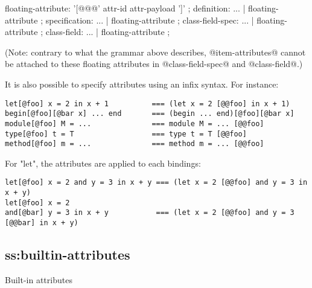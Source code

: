 \begin{syntax}
floating-attribute:
    '[@@@' attr-id attr-payload ']'
;
definition: ...
   | floating-attribute
;
specification: ...
   | floating-attribute
;
class-field-spec: ...
   | floating-attribute
;
class-field: ...
   | floating-attribute
;
\end{syntax}

(Note: contrary to what the grammar above describes, @item-attributes@
cannot be attached to these floating attributes in @class-field-spec@
and @class-field@.)


It is also possible to specify attributes using an infix syntax. For instance:

\begin{verbatim}
let[@foo] x = 2 in x + 1          === (let x = 2 [@@foo] in x + 1)
begin[@foo][@bar x] ... end       === (begin ... end)[@foo][@bar x]
module[@foo] M = ...              === module M = ... [@@foo]
type[@foo] t = T                  === type t = T [@@foo]
method[@foo] m = ...              === method m = ... [@@foo]
\end{verbatim}

For "let", the attributes are applied to each bindings:

\begin{verbatim}
let[@foo] x = 2 and y = 3 in x + y === (let x = 2 [@@foo] and y = 3 in x + y)
let[@foo] x = 2
and[@bar] y = 3 in x + y           === (let x = 2 [@@foo] and y = 3 [@@bar] in x + y)
\end{verbatim}


\subsection{ss:builtin-attributes}{Built-in attributes}

